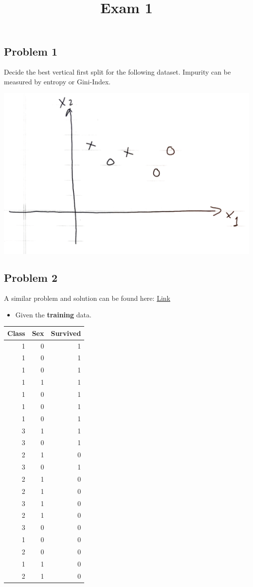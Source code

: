 \documentclass[
]{article}
\title{Exam 1}
\author{}
\date{\vspace{-2.5em}}
\providecommand{\tightlist}{%
  \setlength{\itemsep}{0pt}\setlength{\parskip}{0pt}}
\begin{document}
\maketitle

\hypertarget{problem-1}{%
\subsection{Problem 1}\label{problem-1}}

Decide the best vertical first split for the following dataset. Impurity
can be measured by entropy or Gini-Index.

\includegraphics{images/s15.png}

\hypertarget{problem-2}{%
\subsection{Problem 2}\label{problem-2}}

A similar problem and solution can be found here:
\href{Exam1/Exam1.html}{Link}

\begin{itemize}
\tightlist
\item
  Given the \textbf{training} data.
\end{itemize}

\begin{longtable}[]{@{}rrr@{}}
\toprule
Class & Sex & Survived\tabularnewline
\midrule
\endhead
1 & 0 & 1\tabularnewline
1 & 0 & 1\tabularnewline
1 & 0 & 1\tabularnewline
1 & 1 & 1\tabularnewline
1 & 0 & 1\tabularnewline
1 & 0 & 1\tabularnewline
1 & 0 & 1\tabularnewline
3 & 1 & 1\tabularnewline
3 & 0 & 1\tabularnewline
2 & 1 & 0\tabularnewline
3 & 0 & 1\tabularnewline
2 & 1 & 0\tabularnewline
2 & 1 & 0\tabularnewline
3 & 1 & 0\tabularnewline
2 & 1 & 0\tabularnewline
3 & 0 & 0\tabularnewline
1 & 0 & 0\tabularnewline
2 & 0 & 0\tabularnewline
1 & 1 & 0\tabularnewline
2 & 1 & 0\tabularnewline
\bottomrule
\end{longtable}
\end{document}
